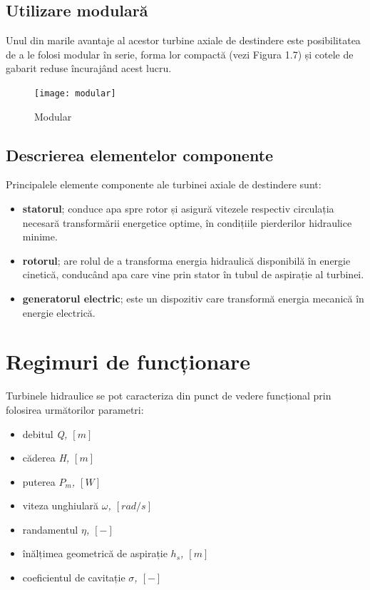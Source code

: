 \clearpage


\subsection{Utilizare modulară}
Unul din marile avantaje al acestor turbine axiale de destindere este posibilitatea de a le folosi modular în serie, forma lor compactă (vezi Figura 1.7) și cotele de gabarit reduse încurajând acest lucru.

\begin{figure}[h!]
	\centering
	\texttt{[image: modular]}
	\caption{Modular \cite{hasmatuchi2014new}}
	\label{Modular}
\end{figure}

\subsection{Descrierea elementelor componente}

Principalele elemente componente ale turbinei axiale de destindere sunt:

\begin{itemize}
	\item \textbf{statorul}; conduce apa spre rotor și asigură vitezele respectiv circulația necesară transformării energetice optime, în condițiile pierderilor hidraulice minime.
	\item \textbf{rotorul}; are rolul de a transforma energia hidraulică disponibilă în energie cinetică, conducând apa care vine prin stator în tubul de aspirație al turbinei.
	\item \textbf{generatorul electric}; este un dispozitiv care transformă energia mecanică în energie electrică.
\end{itemize}


\section{Regimuri de funcționare}

Turbinele hidraulice se pot caracteriza din punct de vedere funcțional prin folosirea următorilor parametri:

\begin{itemize}
	\item debitul \textit{Q, $[\si{m}]$}
	\item căderea \textit{H, $[\si{m}]$}
	\item puterea \textit{$P_m$, $[\si{W}]$}
	\item viteza unghiular\u{a} \textit{\(\omega\), $[\si{rad/s}]$}
	\item randamentul \textit{\(\eta\), $[-]$}
	\item înălțimea geometrică de aspirație \textit{\(h_s\), $[\si{m}]$}
	\item coeficientul de cavitație \textit{\(\sigma\), $[-]$}
\end{itemize}


